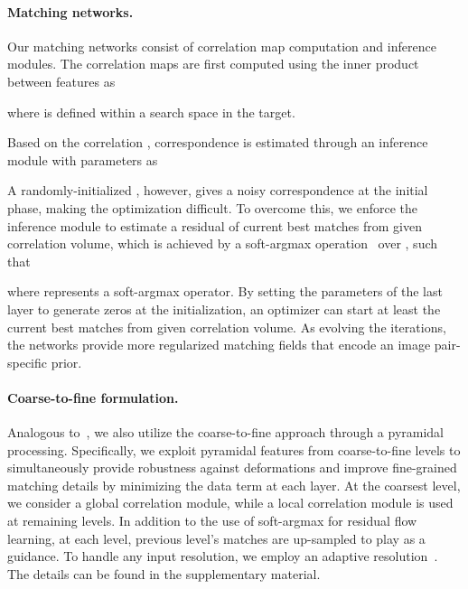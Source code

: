 \documentclass[10pt,twocolumn,letterpaper]{article}
\begin{document}
\paragraph{Matching networks.}
Our matching networks consist of correlation map computation and inference modules. The correlation maps are first computed using the inner product between features as

where  is defined within a search space in the target. 

Based on the correlation , correspondence  is estimated through an inference module with parameters  as

A randomly-initialized , however, gives a noisy correspondence at the initial phase, making the optimization difficult. To overcome this, we enforce the inference module to estimate a residual of current best matches from given correlation volume, which is achieved by a soft-argmax operation~\cite{Kendall_2017_ICCV} over , such that

where  represents a soft-argmax operator. 
By setting the parameters of the last layer to generate zeros at the initialization, an optimizer can start at least the current best matches from given correlation volume. As evolving the iterations, the networks provide more regularized matching fields that encode an image pair-specific prior. 
\vspace{-10pt}

\paragraph{Coarse-to-fine formulation.}
Analogous to~\cite{Sun_2018_CVPR,sun2018pwc,jeon2018parn,melekhov2019dgc,truong2020glu}, we also utilize the coarse-to-fine approach through a pyramidal processing. Specifically, we exploit pyramidal features from coarse-to-fine levels to simultaneously provide robustness against deformations and improve fine-grained matching details by minimizing the data term at each layer. At the coarsest level, we consider a global correlation module, while a local correlation module is used at remaining levels. In addition to the use of  soft-argmax for residual flow learning, at each level, previous level's matches are up-sampled to play as a guidance. To handle any input resolution, we employ an adaptive resolution~\cite{truong2020glu}. The details can be found in the supplementary material.
\end{document}
